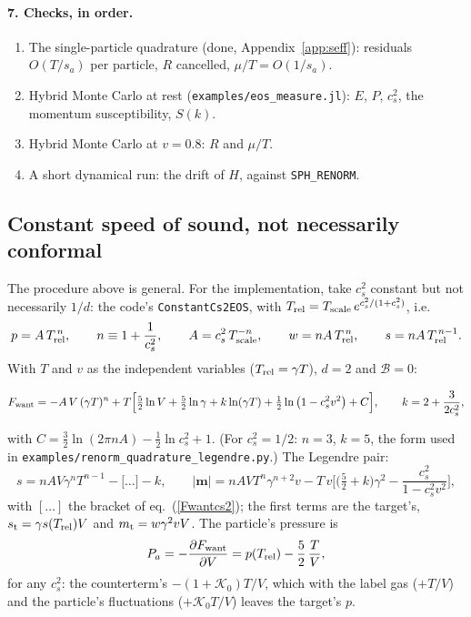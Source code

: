 \documentclass[11pt,aps,preprint,nofootinbib,superscriptaddress,tightenlines]{revtex4-2}
\def\st{\begin{equation}}
\def\stp{\end{equation}}
\def\Eq#1{eq.~(\ref{#1})}
\def\App#1{Appendix~\ref{#1}}
\let\oldparagraph\paragraph
\renewcommand{\paragraph}{\par\bigskip\oldparagraph}
\begin{document}
\paragraph{7. Checks, in order.}
\begin{enumerate}
\item The single-particle quadrature (done, \App{app:seff}): residuals $O(T/s_a)$ per particle, $R$ cancelled, $\mu/T=O(1/s_a)$.
\item Hybrid Monte Carlo at rest (\nolinkurl{examples/eos_measure.jl}): $E$, $P$, $c_s^2$, the momentum susceptibility, $S(k)$.
\item Hybrid Monte Carlo at $v=0.8$: $R$ and $\mu/T$.
\item A short dynamical run: the drift of $H$, against \texttt{SPH\_RENORM}.
\end{enumerate}

\subsection{Constant speed of sound, not necessarily conformal}
\label{app:constcs2}

The procedure above is general.  For the implementation, take $c_s^2$ constant but not necessarily $1/d$: the code's \texttt{ConstantCs2EOS}, with
$T_{\rm rel}=T_{\rm scale}\,e^{c_s^2/(1+c_s^2)}$, i.e.
\st
p=A\,T_{\rm rel}^{\,n},\qquad n\equiv1+\frac1{c_s^2},\qquad A=c_s^2\,T_{\rm scale}^{-n},\qquad w=nA\,T_{\rm rel}^{\,n},\qquad s=nA\,T_{\rm rel}^{\,n-1} .
\stp
With $T$ and $v$ as the independent variables ($T_{\rm rel}=\gamma T$), $d=2$ and $\mathcal B=0$:
\begin{keyeq}
\st
F_{\rm want}=-A\,V\,(\gamma T)^n+T\Big[\tfrac52\ln V+\tfrac52\ln\gamma+k\ln(\gamma T)+\tfrac12\ln\big(1-c_s^2v^2\big)+C\Big],\qquad k=2+\frac{3}{2c_s^2},
\label{Fwantcs2}
\stp
\end{keyeq}
with $C=\tfrac32\ln(2\pi nA)-\tfrac12\ln c_s^2+1$.  (For $c_s^2=1/2$: $n=3$, $k=5$, the form used in \nolinkurl{examples/renorm_quadrature_legendre.py}.)  The Legendre pair:
\st
s=nAV\gamma^nT^{n-1}-\big[\ldots\big]-k,\qquad
|\bm m|=nAVT^n\gamma^{n+2}v-T\,v\Big[\big(\tfrac52+k\big)\gamma^2-\frac{c_s^2}{1-c_s^2v^2}\Big],
\stp
with $[\ldots]$ the bracket of \Eq{Fwantcs2}; the first terms are the target's, $s_{\rm t}=\gamma s(T_{\rm rel})V$ and $m_{\rm t}=w\gamma^2vV$.  The particle's pressure is
\st
P_a=-\frac{\partial F_{\rm want}}{\partial V}=p(T_{\rm rel})-\frac52\,\frac TV ,
\stp
for any $c_s^2$: the counterterm's $-(1+\mathcal K_0)T/V$, which with the label gas ($+T/V$) and the particle's fluctuations ($+\mathcal K_0T/V$) leaves the target's $p$.
\end{document}
